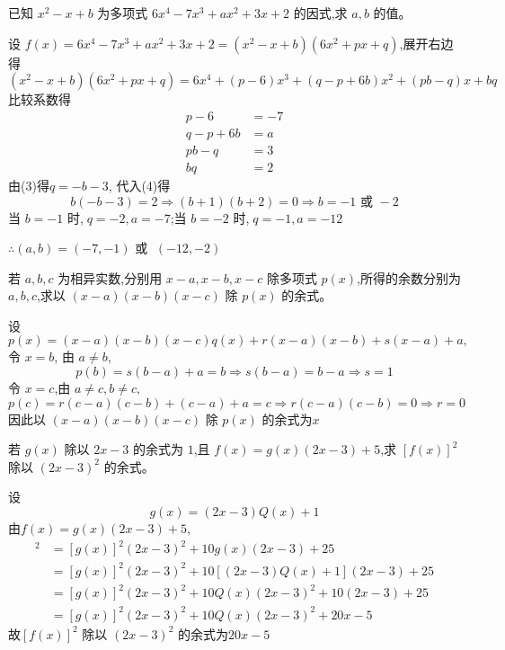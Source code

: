 \begin{questions}
    \question 已知 $x^2 - x + b$ 为多项式 $6x^4 - 7x^3 + a x^2 + 3x + 2$ 的因式,求 $a,b$ 的值。
    \begin{solution}
        设 $f(x) = 6x^4 - 7x^3 + ax^2 + 3x + 2= (x^2 - x + b)(6x^2 + px + q)$,展开右边得
        \[
        (x^2 - x + b)(6x^2 + px + q)
        = 6x^4 + (p - 6)x^3 + (q - p + 6b)x^2 + (pb - q)x + bq
        \]
        比较系数得
        \begin{align}
        p - 6 &= -7 \tag{1} \\
        q - p + 6b &= a \tag{2} \\
        pb - q &= 3 \tag{3} \\
        bq &= 2 \tag{4}
        \end{align}
        由(3)得$q = -b - 3$, 代入(4)得
        \[
        b(-b - 3) = 2 
        \Rightarrow (b + 1)(b + 2) = 0
        \Rightarrow b = -1 \text{ 或 } -2
        \]
        当 $b = -1$ 时,$\;q = -2,a = -7$;当 $b = -2$ 时,$\;q = -1,a = - 12$
        
        $\therefore (a,b) = (-7, -1) \text{ 或 } \;(-12, -2)$
    \end{solution}
    
    \question 若 $a,b,c$ 为相异实数,分别用 $x - a, x - b, x - c$ 除多项式 $p(x)$,所得的余数分别为 $a, b, c$,求以 $(x - a)(x - b)(x - c)$ 除 $p(x)$ 的余式。 
    \begin{solution}
        设
        \[
        p(x) = (x-a)(x-b)(x-c)q(x) + r(x-a)(x-b)+s(x-a)+a,
        \]
        令 $x = b$, 由 $a \ne b$,
        \[
        p(b) = s(b-a)+a = b  \Rightarrow s(b-a) = b-a \Rightarrow s=1
        \]
        令 $x = c$,由 $a \ne c,b \ne c,$
        \[
        p(c) = r(c-a)(c-b)+(c-a)+a = c  \Rightarrow r(c-a)(c-b)=0 \Rightarrow r=0
        \]
        因此以 $(x - a)(x - b)(x - c)$ 除 $p(x)$ 的余式为$x$
    \end{solution}
    
    \question 若 $g(x)$ 除以 $2x - 3$ 的余式为 $1$,且 $f(x) = g(x)(2x - 3) + 5$,求 $[f(x)]^2$ 除以 $(2x - 3)^2$ 的余式。
    \begin{solution}
        设\[
        g(x)=(2x-3)Q(x)+1
        \]
        由$f(x) = g(x)(2x - 3) + 5$,
        \begin{align*}
        [f(x)]^2 
        &=[g(x)]^2(2x-3)^2+10g(x)(2x-3)+25 \\
        &=[g(x)]^2(2x-3)^2+10[(2x-3)Q(x)+1](2x-3)+25\\
        &=[g(x)]^2(2x-3)^2+10Q(x)(2x-3)^2+10(2x-3)+25\\
        &=[g(x)]^2(2x-3)^2+10Q(x)(2x-3)^2+20x-5
        \end{align*}
        故$[f(x)]^2$ 除以 $(2x - 3)^2$ 的余式为$20x - 5$
    \end{solution}
    

\end{questions}
